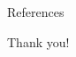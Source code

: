 \documentclass[9pt]{beamer}
\newcommand{\themename}{\textbf{\textsc{metropolis}}\xspace}
\begin{document}




\begin{frame}{References}


\end{frame}









\begin{frame}[standout]
  Thank you!
\end{frame}
\end{document}
